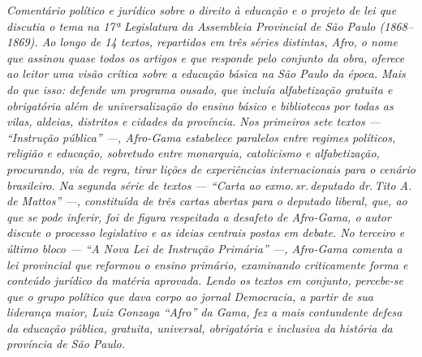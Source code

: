 \begin{argumento}\itshape
Comentário político e jurídico sobre o direito à educação e o projeto de
lei que discutia o tema na 17ª Legislatura da Assembleia Provincial de
São Paulo (1868--1869). Ao longo de 14 textos, repartidos em três séries distintas,
Afro, o nome que assinou quase todos os artigos e que
responde pelo conjunto da obra, oferece ao leitor uma visão crítica
sobre a educação básica na São Paulo da época. Mais do que isso: defende
um programa ousado, que incluía alfabetização gratuita e obrigatória
além de universalização do ensino básico e bibliotecas por todas as
vilas, aldeias, distritos e cidades da província. Nos primeiros sete
textos --- ``Instrução pública'' ---, Afro-Gama estabelece
paralelos entre regimes políticos, religião e educação, sobretudo entre
monarquia, catolicismo e alfabetização, procurando, via de regra, tirar
lições de experiências internacionais para o cenário brasileiro. Na
segunda série de textos --- ``Carta ao exmo.\,sr.\,deputado dr.\,Tito A. de
Mattos'' ---, constituída de três cartas abertas para o deputado
liberal, que, ao que se pode inferir, foi de figura respeitada a
desafeto de Afro-Gama, o autor discute o processo legislativo e
as ideias centrais postas em debate. No terceiro e último bloco --- ``A
Nova Lei de Instrução Primária'' ---, Afro-Gama comenta a lei
provincial que reformou o ensino primário, examinando criticamente forma
e conteúdo jurídico da matéria aprovada. Lendo os textos em conjunto,
percebe-se que o grupo político que dava corpo ao jornal
\textnormal{Democracia}, a partir de sua liderança maior, Luiz Gonzaga ``Afro''
da Gama, fez a mais contundente defesa da educação pública,
gratuita, universal, obrigatória e inclusiva da história da província de
São Paulo.
\end{argumento}


